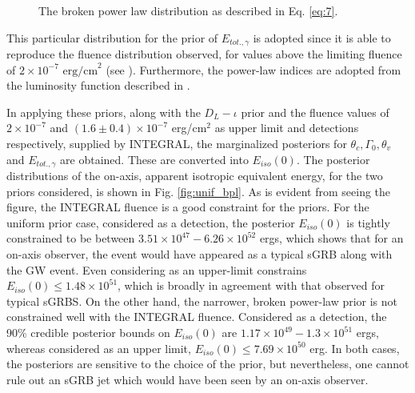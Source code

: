     \begin{figure}[H]
        \centering
        \def\svgwidth{0.5\textwidth}
        
        \caption[Broken power law distribution from \cite{ghirlanda_2016}.]{
            The broken power law distribution as described in Eq. \ref{eq:7}.
        }
        \label{fig:bpl_demo}
    \end{figure}

    This particular distribution for the prior of $E_{tot., \gamma}$ is adopted since it
    is able to reproduce the fluence distribution observed, for values above the
    limiting fluence of $2 \times 10^{-7} \text{ erg/cm}^2$ (see \cite{mohan_2019}).
    Furthermore, the power-law indices are adopted from the luminosity function
    described in \cite{ghirlanda_2016}.

    In applying these priors, along with the $D_L-\iota$ prior and the fluence values of
    $2 \times 10^{-7}$ and $(1.6 \pm 0.4) \times 10^{-7}$ erg/cm$^2$ as upper limit and
    detections respectively, supplied by INTEGRAL, the marginalized posteriors for
    $\theta_c, \Gamma_0, \theta_v$ and $E_{tot., \gamma}$ are obtained. These are
    converted into $E_{iso}(0)$. The posterior distributions of the on-axis, apparent
    isotropic equivalent energy, for the two priors considered, is shown in Fig.
    \ref{fig:unif_bpl}. As is evident from seeing the figure, the INTEGRAL fluence is a
    good constraint for the priors. For the uniform prior case, considered as a
    detection, the posterior $E_{iso}(0)$ is tightly constrained to be between
    $3.51\times 10^{47} - 6.26 \times 10^{52}$ ergs, which shows that for an on-axis
    observer, the event would have appeared as a typical sGRB along with the GW event.
    Even considering as an upper-limit constrains $E_{iso}(0) \leq 1.48\times 10^{51}$,
    which is broadly in agreement with that observed for typical sGRBS.  On the other
    hand, the narrower, broken power-law prior is not constrained well with the INTEGRAL
    fluence. Considered as a detection, the 90\% credible posterior bounds on
    $E_{iso}(0)$ are $1.17\times10^{49}-1.3\times10^{51}$ ergs, whereas considered as an
    upper limit, $E_{iso}(0) \leq 7.69 \times 10^{50}$ erg. In both cases, the
    posteriors are sensitive to the choice of the prior, but nevertheless, one cannot
    rule out an sGRB jet which would have been seen by an on-axis observer.

